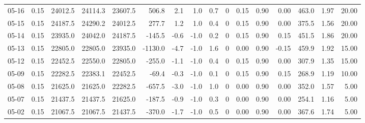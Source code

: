 \begin{threeparttable}
{\begin{tabular}{lrrrrrrrrrrrrrrr}
  05-16 &     0.15 & 24012.5 & 24114.3 & 23607.5 &      506.8 &            2.1 &                      1.0 &                 0.7 &              0 &       0.15 &      0.90 &           0.00 &            463.0 &            1.97 &                  20.00 \\
  05-15 &     0.15 & 24187.5 & 24290.2 & 24012.5 &      277.7 &            1.2 &                      1.0 &                 0.4 &              0 &       0.15 &      0.90 &           0.00 &            375.5 &            1.56 &                  20.00 \\
  05-14 &     0.15 & 23935.0 & 24042.0 & 24187.5 &     -145.5 &           -0.6 &                     -1.0 &                 0.2 &              0 &       0.15 &      0.90 &           0.15 &            451.5 &            1.86 &                  20.00 \\
  05-13 &     0.15 & 22805.0 & 22805.0 & 23935.0 &    -1130.0 &           -4.7 &                     -1.0 &                 1.6 &              0 &       0.00 &      0.90 &          -0.15 &            459.9 &            1.92 &                  15.00 \\
  05-12 &     0.15 & 22452.5 & 22550.0 & 22805.0 &     -255.0 &           -1.1 &                     -1.0 &                 0.4 &              0 &       0.15 &      0.90 &           0.00 &            307.9 &            1.35 &                  15.00 \\
  05-09 &     0.15 & 22282.5 & 22383.1 & 22452.5 &      -69.4 &           -0.3 &                     -1.0 &                 0.1 &              0 &       0.15 &      0.90 &           0.15 &            268.9 &            1.19 &                  10.00 \\
  05-08 &     0.15 & 21625.0 & 21625.0 & 22282.5 &     -657.5 &           -3.0 &                     -1.0 &                 1.0 &              0 &       0.00 &      0.90 &           0.00 &            352.0 &            1.57 &                   5.00 \\
  05-07 &     0.15 & 21437.5 & 21437.5 & 21625.0 &     -187.5 &           -0.9 &                     -1.0 &                 0.3 &              0 &       0.00 &      0.90 &           0.00 &            254.1 &            1.16 &                   5.00 \\
  05-02 &     0.15 & 21067.5 & 21067.5 & 21437.5 &     -370.0 &           -1.7 &                     -1.0 &                 0.5 &              0 &       0.00 &      0.90 &           0.00 &            367.6 &            1.74 &                   5.00 \\

\end{tabular}}
\end{threeparttable}

